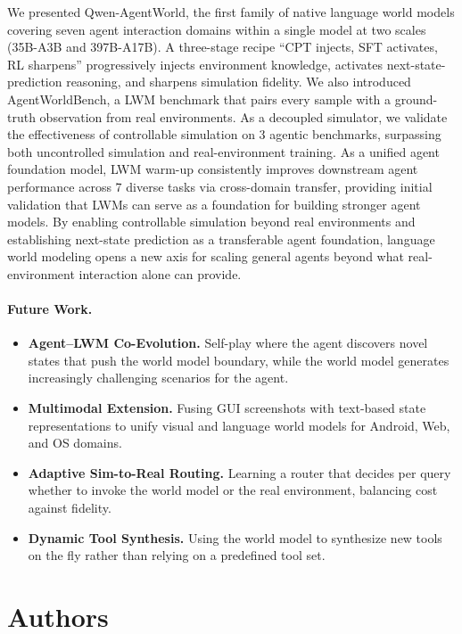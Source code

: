 \documentclass{llmxive}
\providecommand{\method}{Qwen-AgentWorld\xspace}
\providecommand{\bench}{AgentWorldBench\xspace}
\begin{document}
We presented \method, the first family of native language world models covering seven agent interaction domains within a single model at two scales (35B-A3B and 397B-A17B).
A three-stage recipe ``CPT injects, SFT activates, RL sharpens'' progressively injects environment knowledge, activates next-state-prediction reasoning, and sharpens simulation fidelity.
We also introduced \bench, a LWM benchmark that pairs every sample with a ground-truth observation from real environments.
As a decoupled simulator, we validate the effectiveness of controllable simulation on 3 agentic benchmarks, surpassing both uncontrolled simulation and real-environment training.
As a unified agent foundation model, LWM warm-up consistently improves downstream agent performance across 7 diverse tasks via cross-domain transfer, providing initial validation that LWMs can serve as a foundation for building stronger agent models.
By enabling controllable simulation beyond real environments and establishing next-state prediction as a transferable agent foundation, language world modeling opens a new axis for scaling general agents beyond what real-environment interaction alone can provide.

\paragraph{Future Work.}

\begin{itemize}[leftmargin=1.5em,itemsep=2pt]
\item \textbf{Agent--LWM Co-Evolution.} Self-play where the agent discovers novel states that push the world model boundary, while the world model generates increasingly challenging scenarios for the agent.
\item \textbf{Multimodal Extension.} Fusing GUI screenshots with text-based state representations to unify visual and language world models for Android, Web, and OS domains.
\item \textbf{Adaptive Sim-to-Real Routing.} Learning a router that decides per query whether to invoke the world model or the real environment, balancing cost against fidelity.
\item \textbf{Dynamic Tool Synthesis.} Using the world model to synthesize new tools on the fly rather than relying on a predefined tool set.
\end{itemize}

\section{Authors}
\end{document}
